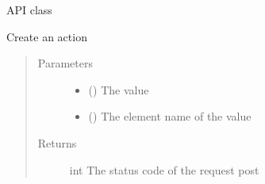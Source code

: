 \documentclass[letterpaper,10pt,english]{sphinxmanual}
\begin{document}
\begin{fulllineitems}
\label{\detokenize{index:Api.Api}}
\sphinxAtStartPar
API class

\begin{fulllineitems}
\label{\detokenize{index:Api.Api.create_action}}
\sphinxAtStartPar
Create an action
\begin{quote}\begin{description}
\item[{Parameters}] \leavevmode\begin{itemize}
\item {} 
\sphinxAtStartPar
{} () \textendash{} The value

\item {} 
\sphinxAtStartPar
{} () \textendash{} The element name of the value

\end{itemize}

\item[{Returns}] \leavevmode
\sphinxAtStartPar
int \textendash{} The status code of the request post

\end{description}\end{quote}

\end{fulllineitems}



\end{fulllineitems}
\end{document}
